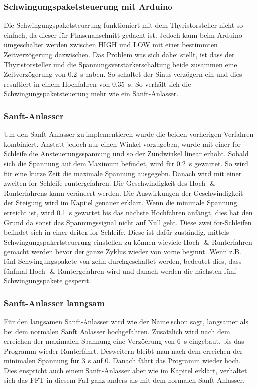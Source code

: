 \subsubsection{Schwingungspaketsteuerung mit Arduino}
Die Schwingungspaketsteuerung funktioniert mit dem Thyristorsteller nicht so einfach, da dieser für Phasenanschnitt gedacht ist. Jedoch kann beim Arduino umgeschaltet werden zwischen HIGH und LOW mit einer bestimmten Zeitverzögerung dazwischen. Das Problem was sich dabei stellt, ist dass der Thyristorsteller und die Spannungsverstärkerschaltung beide zusammen eine Zeitverzögerung von \SI{0.2}{s} haben. So schaltet der Sinus verzögern ein und dies resultiert in einem Hochfahren von \SI{0.35}{s}. So verhält sich die Schwingungspaketsteuerung mehr wie ein Sanft-Anlasser.

\subsubsection{Sanft-Anlasser}
Um den Sanft-Anlasser zu implementieren wurde die beiden vorherigen Verfahren kombiniert. Anstatt jedoch nur einen Winkel vorzugeben, wurde mit einer for-Schleife die Ansteuerungsspannung und so der Zündwinkel linear erhöht. Sobald sich die Spannung auf dem Maximum befindet, wird für \SI{0.2}{s} gewartet. So wird für eine kurze Zeit die maximale Spannung ausgegebn. Danach wird mit einer zweiten for-Schleife runtergefahren. Die Geschwindigkeit des Hoch- \& Runterfahrens kann verändert werden. Die Auswirkungen der Geschwindigkeit der Steigung wird im Kapitel  genauer erklärt. Wenn die minimale Spannung erreicht ist, wird \SI{0.1}{s} gewartet bis das nächste Hochfahren anfängt, dies hat den Grund da sonst das Spannungssignal nicht auf Null geht. Diese zwei for-Schleifen befindet sich in einer driten for-Schleife. Diese ist dafür zuständig, mittels Schwingungspakertsteuerung einstellen zu können wieviele Hoch- \& Runterfahren gemacht werden bevor der ganze Zyklus wieder von vorne beginnt. Wenn z.B. fünf Schwingungspakete von zehn durchgeschaltet werden, bedeutet dies, dass fünfmal Hoch- \& Runtergefahren wird und danach werden die nächsten fünf Schwingungspakete gesperrt.

\subsubsection{Sanft-Anlasser lanngsam}
Für den langsamen Sanft-Anlasser wird wie der Name schon sagt, langsamer als bei dem normalen Sanft Anlasser hochgefahren. Zusätzlich wird nach dem erreichen der maximalen Spannung eine Verzöerung von \SI{6}{s} eingebaut, bis das Programm wieder Runterfährt. Desweitern bleibt man nach dem erreichen der minimalen Spannung für \SI{3}{s} auf 0. Danach fährt das Programm wieder hoch. Dies enspricht auch einem Sanft-Anlasser aber wie im Kapitel  erklärt, verhaltet sich das FFT in diesem Fall ganz anders als mit dem normalen Sanft-Anlasser.

